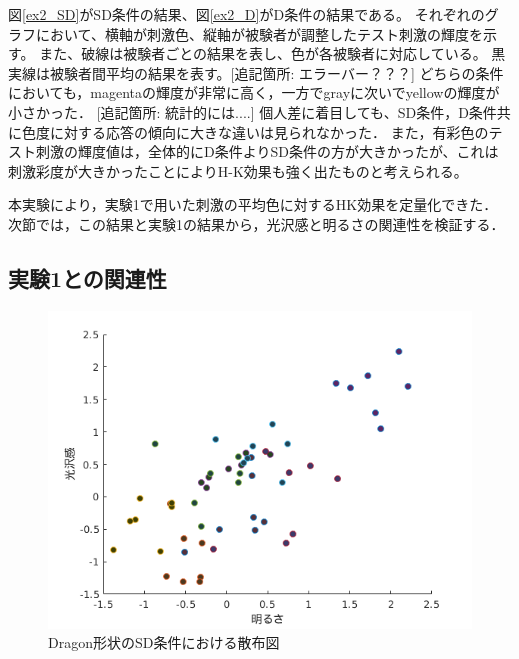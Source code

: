             図\ref{ex2_SD}がSD条件の結果、図\ref{ex2_D}がD条件の結果である。
            それぞれのグラフにおいて、横軸が刺激色、縦軸が被験者が調整したテスト刺激の輝度を示す。
            また、破線は被験者ごとの結果を表し、色が各被験者に対応している。
            黒実線は被験者間平均の結果を表す。[追記箇所: エラーバー？？？]
            どちらの条件においても，magentaの輝度が非常に高く，一方でgrayに次いでyellowの輝度が小さかった．
            [追記箇所: 統計的には....]
            個人差に着目しても、SD条件，D条件共に色度に対する応答の傾向に大きな違いは見られなかった．
            また，有彩色のテスト刺激の輝度値は，全体的にD条件よりSD条件の方が大きかったが、これは刺激彩度が大きかったことによりH-K効果も強く出たものと考えられる。

            本実験により，実験1で用いた刺激の平均色に対するHK効果を定量化できた．
            次節では，この結果と実験1の結果から，光沢感と明るさの関連性を検証する．

    \newpage
        \subsection{実験1との関連性}

            \begin{figure}[h]
                \centering
                \includegraphics[width=12.0cm]{./img/ex3_DSD.png}
                \caption{Dragon形状のSD条件における散布図}
                \label{ex3_DSD}
            \end{figure}

